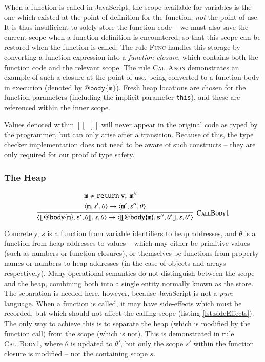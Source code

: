 \documentclass[12pt,a4paper,twoside,openright]{report}
\newcommand*{\js}{\texttt}
\begin{document}
When a function is called in JavaScript, the scope available for variables is
the one which existed at the point of definition for the function, \textit{not}
the point of use. It is thus insufficient to solely store the function code --
we must also save the current scope when a function definition is encountered,
so that this scope can be restored when the function is called. The rule
\textsc{Func} handles this storage by converting a function expression into a
\textit{function closure}, which contains both the function code and the
relevant scope. The rule \textsc{CallAnon} demonstrates an example of such a
closure at the point of use, being converted to a function body in execution
(denoted by $\mathtt{@body\{m\}}$). Fresh heap locations are chosen for the 
function parameters (including the implicit parameter \js{this}), and these
are referenced within the inner scope.

Values denoted within $[\![\enspace]\!]$ will never appear in
the original code as typed by the programmer, but can only arise after a
transition. Because of this, the type checker implementation does not need to
be aware of such constructs -- they are only required for our proof of type
safety.


\subsubsection*{The Heap}

$$\infer[\textsc{CallBody1}]
{\langle \mathtt{[\![@body\{m\}, s', \theta]\!]}, s, \theta\rangle  \rightarrow
\langle \mathtt{[\![@body\{m\}, s'', \theta']\!]}, s, \theta'\rangle }
{ \begin{split}
  & \mathtt{m} \not = \mathtt{return\ v;\ m''} \\
  & \langle\mathtt{m}, s', \theta\rangle\rightarrow\langle \mathtt{m'},s'', \theta\rangle
\end{split}
}$$

Concretely, $s$ is a function from variable identifiers to heap addresses, and
$\theta$ is a function from heap addresses to values -- which may either be
primitive values (such as numbers or function closures), or themselves be
functions from property names or numbers to heap addresses (in the case of
objects and arrays respectively). Many operational semantics do not distinguish
between the scope and the heap, combining both into a single entity normally
known as the store. The separation is needed here, however, because JavaScript
is not a \textit{pure} language. When a function is called, it may have
side-effects which must be recorded, but which should not affect the calling
scope (listing \ref{lst:sideEffects}). The only way to achieve this is to
separate the heap (which is modified by the function call) from the scope
(which is not). This is demonstrated in rule \textsc{CallBody1}, where $\theta$
is updated to $\theta'$, but only the scope $s'$ within the function closure is
modified -- not the containing scope $s$.
\end{document}
